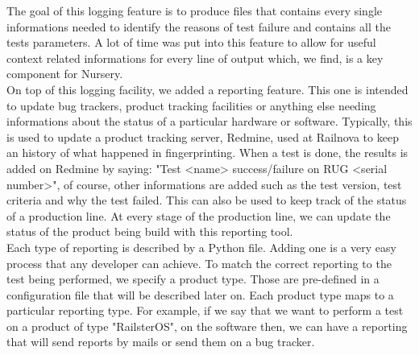 \documentclass[12pt]{article}
\theoremstyle{definition}
\theoremstyle{definition}
\begin{document}
The goal of this logging feature is to produce files that contains every single informations needed to identify the reasons of test failure and contains all the tests parameters. A lot of time was put into this feature to allow for useful context related informations for every line of output which, we find, is a key component for Nursery.\\

On top of this logging facility, we added a reporting feature. This one is intended to update bug trackers, product tracking facilities or anything else needing informations about the status of a particular hardware or software. Typically, this is used to update a product tracking server, Redmine, used at Railnova to keep an history of what happened in fingerprinting. When a test is done, the results is added on Redmine by saying: "Test <name> success/failure on RUG <serial number>", of course, other informations are added such as the test version, test criteria and why the test failed. This can also be used to keep track of the status of a production line. At every stage of the production line, we can update the status of the product being build with this reporting tool.\\

Each type of reporting is described by a Python file. Adding one is a very easy process that any developer can achieve. To match the correct reporting to the test being performed, we specify a product type. Those are pre-defined in a configuration file that will be described later on. Each product type maps to a particular reporting type. For example, if we say that we want to perform a test on a product of type "RailsterOS", on the software then, we can have a reporting that will send reports by mails or send them on a bug tracker.\\
\end{document}
